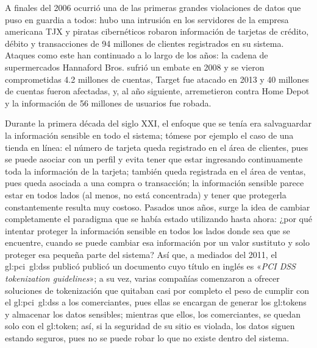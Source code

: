 A finales del 2006 ocurrió una de las primeras grandes violaciones de datos
que puso en guardia a todos: hubo una intrusión en los servidores de la empresa
americana TJX y piratas cibernéticos robaron información de tarjetas de crédito,
débito y transacciones de 94 millones de clientes registrados en su sistema.
Ataques como este han continuado a lo largo de los años: la cadena
de supermercados Hannaford Bros. sufrió un embate en 2008 y se vieron
comprometidas 4.2 millones de cuentas, Target fue atacado en 2013 y 40 millones
de cuentas fueron afectadas, y, al año siguiente, arremetieron contra Home Depot
y la información de 56 millones de usuarios fue robada.

Durante la primera década del siglo XXI, el enfoque que se tenía era
salvaguardar la información sensible en todo el sistema; tómese por ejemplo el
caso de una tienda en línea: el número de tarjeta queda registrado
en el área de clientes, pues se puede asociar con un perfil y evita tener que
estar ingresando continuamente toda la información de la tarjeta; también queda
registrada en el área de ventas, pues queda asociada a una compra o transacción;
la información sensible parece estar en todos lados (al menos, no está
concentrada) y tener que protegerla constantemente resulta muy costoso. Pasados
unos años, surge la idea de cambiar completamente el paradigma que se había
estado utilizando hasta ahora: ¿por qué intentar proteger la información
sensible en todos los lados donde sea que se encuentre, cuando se puede cambiar
esa información por un valor sustituto y solo proteger esa pequeña parte del
sistema? Así que, a mediados del 2011, el \gls{gl:pci}~\gls{gl:dss} publicó
publicó un documento cuyo título en inglés es «\textit{PCI DSS tokenization
guidelines}»; a su vez, varias compañías comenzaron a ofrecer soluciones de
tokenización\footnotemark{} que quitaban casi por completo el peso de cumplir
con el \gls{gl:pci}~\gls{gl:dss} a los comerciantes, pues ellas se encargan de
generar los \glspl{gl:token} y almacenar los datos sensibles; mientras que
ellos, los comerciantes, se quedan solo con el \gls{gl:token}; así, si la
seguridad de su sitio es violada, los datos siguen estando seguros, pues no se
puede robar lo que no existe dentro del sistema.

%
%
%

